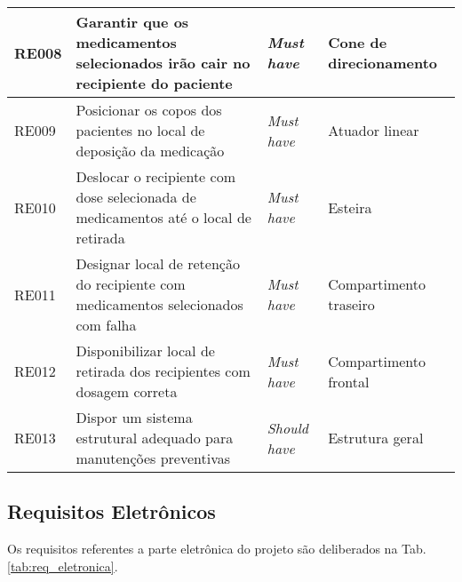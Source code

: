 \begin{table}[H]
\begin{adjustbox}{max width = \textwidth}
\begin{tabular}{|L{1.5cm}|L{8.5cm}|C{2.5cm}|C{3.5cm}|}
            RE008 & Garantir que os medicamentos selecionados irão cair no recipiente do paciente & \textit{Must have}  & Cone de direcionamento\\ 
            \hline
            
            RE009 & Posicionar os copos dos pacientes no local de deposição da medicação & \textit{Must have} & Atuador linear\\
            \hline
            
            RE010 & Deslocar o recipiente com dose selecionada de medicamentos até o local de retirada & \textit{Must have} & Esteira\\ 
            \hline
            
            RE011 & Designar local de retenção do recipiente com medicamentos selecionados com falha & \textit{Must have} & Compartimento traseiro\\
            \hline
            
            RE012 & Disponibilizar local de retirada dos recipientes com dosagem correta & \textit{Must have}  & Compartimento frontal\\ 
            \hline
            
            RE013 & Dispor um sistema estrutural adequado para manutenções preventivas & \textit{Should have} & Estrutura geral \\
            \hline
            
        \end{tabular}
	\end{adjustbox}
	\label{tab:req_estruturais}
\end{table}


\newpage
\subsection{Requisitos Eletrônicos}

Os requisitos referentes a parte eletrônica do projeto são deliberados na Tab. \ref{tab:req_eletronica}.

